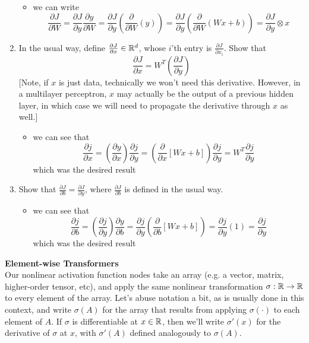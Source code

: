 \documentclass{article}
\newcommand{\nyuparagraph}[1]{\vspace{0.3cm}\textcolor{nyupurple}{\bf \large #1}\\}
\theoremstyle{plain}
\theoremstyle{definition}
\begin{document}
\begin{enumerate}
\begin{itemize}
    \color{blue}
    \item we can write $$\frac{\partial J}{\partial W}=\frac{\partial J}{\partial y}\frac{\partial y}{\partial W}=\frac{\partial J}{\partial y}(\frac{\partial }{\partial W}(y))=\frac{\partial J}{\partial y}(\frac{\partial }{\partial W}(Wx+b))=\frac{\partial J}{\partial y} \otimes x$$ 
\end{itemize}

\item In the usual way, define $\frac{\partial J}{\partial x}\in\mathbb{R}^{d}$,
whose $i$'th entry is $\frac{\partial J}{\partial x_{i}}$. Show
that 
\[
\frac{\partial J}{\partial x}=W^{T}\left(\frac{\partial J}{\partial y}\right)
\]
{[}Note, if $x$ is just data, technically we won't need this derivative.
However, in a multilayer perceptron, $x$ may actually be the output
of a previous hidden layer, in which case we will need to propagate
the derivative through $x$ as well.{]} \\
\begin{itemize}
    \color{blue}
    \item we can see that $$\frac{\partial j}{\partial x}=(\frac{\partial y}{\partial x})\frac{\partial j}{\partial y}=(\frac{\partial }{\partial x}[Wx+b])\frac{\partial j}{\partial y}=W^T\frac{\partial j}{\partial y}$$which was the desired result \blacksquare
\end{itemize}

\item Show that $\frac{\partial J}{\partial b}=\frac{\partial J}{\partial y}$,
where $\frac{\partial J}{\partial b}$ is defined in the usual way.\\

\begin{itemize}
    \color{blue}
    \item we can see that $$\frac{\partial j}{\partial b}=(\frac{\partial j}{\partial y})\frac{\partial y}{\partial b}=\frac{\partial j}{\partial y}(\frac{\partial }{\partial b}[Wx+b])=\frac{\partial j}{\partial y}(1)=\frac{\partial j}{\partial y}$$which was the desired result \blacksquare
\end{itemize}


\setcounter{saveenum}{\value{enumi}}
\end{enumerate}


\nyuparagraph{Element-wise Transformers}

Our nonlinear activation function nodes take an array (e.g. a vector,
matrix, higher-order tensor, etc), and apply the same nonlinear transformation
$\sigma:\mathbb{R}\to\mathbb{R}$ to every element of the array. Let's abuse
notation a bit, as is usually done in this context, and write $\sigma(A)$
for the array that results from applying $\sigma(\cdot)$ to each
element of $A$. If $\sigma$ is differentiable at $x\in\mathbb{R}$,
then we'll write $\sigma'(x)$ for the derivative of $\sigma$ at
$x$, with $\sigma'(A)$ defined analogously to $\sigma(A)$.
\end{document}
